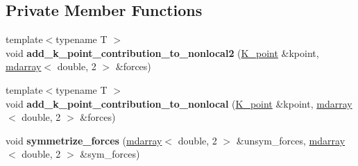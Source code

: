 \subsection*{Private Member Functions}
\begin{DoxyCompactItemize}
\item 
\hypertarget{classsirius_1_1_forces___p_s_a14582be1a8064de69f279f73bab65b28}{}{\footnotesize template$<$typename T $>$ }\\void {\bfseries add\+\_\+k\+\_\+point\+\_\+contribution\+\_\+to\+\_\+nonlocal2} (\hyperlink{classsirius_1_1_k__point}{K\+\_\+point} \&kpoint, \hyperlink{classsddk_1_1mdarray}{mdarray}$<$ double, 2 $>$ \&forces)\label{classsirius_1_1_forces___p_s_a14582be1a8064de69f279f73bab65b28}

\item 
\hypertarget{classsirius_1_1_forces___p_s_a191ebc4db303a217f40c7b5ea59bc1ac}{}{\footnotesize template$<$typename T $>$ }\\void {\bfseries add\+\_\+k\+\_\+point\+\_\+contribution\+\_\+to\+\_\+nonlocal} (\hyperlink{classsirius_1_1_k__point}{K\+\_\+point} \&kpoint, \hyperlink{classsddk_1_1mdarray}{mdarray}$<$ double, 2 $>$ \&forces)\label{classsirius_1_1_forces___p_s_a191ebc4db303a217f40c7b5ea59bc1ac}

\item 
\hypertarget{classsirius_1_1_forces___p_s_afc8b483794f14b71c6a12129af140ba1}{}void {\bfseries symmetrize\+\_\+forces} (\hyperlink{classsddk_1_1mdarray}{mdarray}$<$ double, 2 $>$ \&unsym\+\_\+forces, \hyperlink{classsddk_1_1mdarray}{mdarray}$<$ double, 2 $>$ \&sym\+\_\+forces)\label{classsirius_1_1_forces___p_s_afc8b483794f14b71c6a12129af140ba1}

\end{DoxyCompactItemize}
